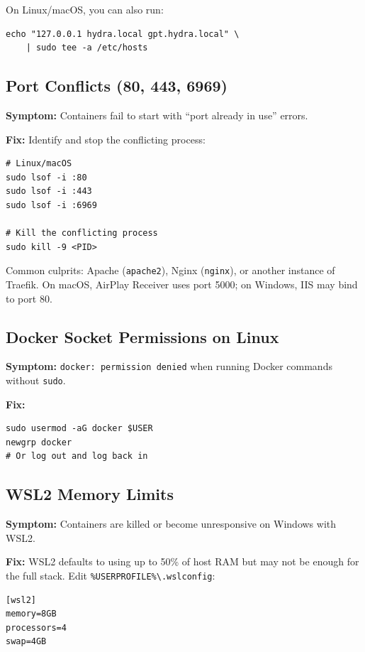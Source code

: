\documentclass[11pt,a4paper]{article}
\newcommand{\cmdref}[1]{\texttt{#1}}
\begin{document}
On Linux/macOS, you can also run:

\begin{lstlisting}[style=bash]
echo "127.0.0.1 hydra.local gpt.hydra.local" \
    | sudo tee -a /etc/hosts
\end{lstlisting}

\subsection{Port Conflicts (80, 443, 6969)}

\textbf{Symptom:} Containers fail to start with ``port already in use''
errors.

\textbf{Fix:} Identify and stop the conflicting process:

\begin{lstlisting}[style=bash]
# Linux/macOS
sudo lsof -i :80
sudo lsof -i :443
sudo lsof -i :6969

# Kill the conflicting process
sudo kill -9 <PID>
\end{lstlisting}

Common culprits: Apache (\texttt{apache2}), Nginx (\texttt{nginx}), or
another instance of Traefik. On macOS, AirPlay Receiver uses port 5000;
on Windows, IIS may bind to port 80.

\subsection{Docker Socket Permissions on Linux}

\textbf{Symptom:} \cmdref{docker: permission denied} when running Docker
commands without \texttt{sudo}.

\textbf{Fix:}

\begin{lstlisting}[style=bash]
sudo usermod -aG docker $USER
newgrp docker
# Or log out and log back in
\end{lstlisting}

\subsection{WSL2 Memory Limits}

\textbf{Symptom:} Containers are killed or become unresponsive on Windows
with WSL2.

\textbf{Fix:} WSL2 defaults to using up to 50\% of host RAM but may not be
enough for the full stack. Edit \cmdref{\%USERPROFILE\%\textbackslash.wslconfig}:

\begin{lstlisting}[style=yaml]
[wsl2]
memory=8GB
processors=4
swap=4GB
\end{lstlisting}
\end{document}
